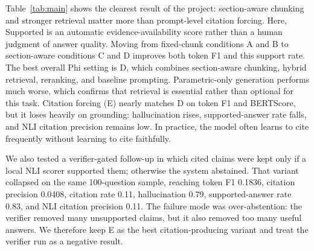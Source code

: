 \documentclass[11pt]{article}
\begin{document}
\begin{table}[t]
\centering
\small
{}
\caption{Main full-validation results for the core Phi experiments and the two main baselines. Citation rate for E is 0.9274.}
\label{tab:main}
\end{table}

Table~\ref{tab:main} shows the clearest result of the project: section-aware chunking and stronger retrieval matter more than prompt-level citation forcing. Here, Supported is an automatic evidence-availability score rather than a human judgment of answer quality. Moving from fixed-chunk conditions A and B to section-aware conditions C and D improves both token F1 and this support rate. The best overall Phi setting is D, which combines section-aware chunking, hybrid retrieval, reranking, and baseline prompting. Parametric-only generation performs much worse, which confirms that retrieval is essential rather than optional for this task. Citation forcing (E) nearly matches D on token F1 and BERTScore, but it loses heavily on grounding: hallucination rises, supported-answer rate falls, and NLI citation precision remains low. In practice, the model often learns to cite frequently without learning to cite faithfully.

We also tested a verifier-gated follow-up in which cited claims were kept only if a local NLI scorer supported them; otherwise the system abstained. That variant collapsed on the same 100-question sample, reaching token F1 0.1836, citation precision 0.0408, citation rate 0.11, hallucination 0.79, supported-answer rate 0.83, and NLI citation precision 0.11. The failure mode was over-abstention: the verifier removed many unsupported claims, but it also removed too many useful answers. We therefore keep E as the best citation-producing variant and treat the verifier run as a negative result.
\end{document}
